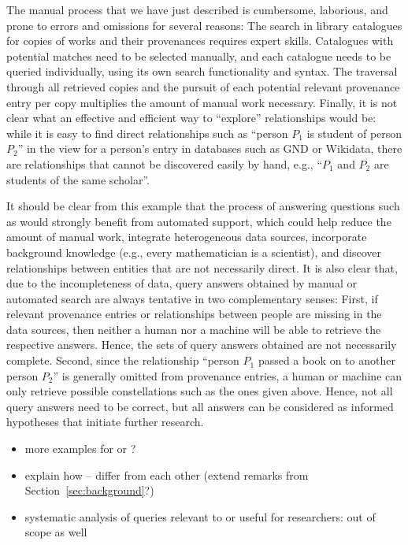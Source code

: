 The manual process that we have just described is cumbersome, laborious, and prone to errors and omissions for several reasons:
The search in library catalogues for copies of works and their provenances requires expert skills.
Catalogues with potential matches need to be selected manually,
and each catalogue needs to be queried individually, using its own search functionality and syntax. 
The traversal through all retrieved copies and the pursuit of each potential relevant provenance entry per copy 
multiplies the amount of manual work necessary.
Finally, it is not clear what an effective and efficient way to \enquote{explore} relationships would be:
while it is easy to find direct relationships such as \enquote{person $P_1$ is student of person $P_2$} in the view for a person's entry
in databases such as GND or Wikidata, there are relationships that cannot be discovered easily by hand,
e.g., \enquote{$P_1$ and $P_2$ are students of the same scholar}.

It should be clear from this example that the process of answering questions such as 
would strongly benefit from automated support, which could help reduce the amount of manual work, integrate heterogeneous data sources,
incorporate background knowledge (e.g., every mathematician is a scientist),
and discover relationships between entities that are not necessarily direct.
It is also clear that, due to the incompleteness of data, query answers obtained by manual or automated search
are always tentative in two complementary senses: First, if relevant provenance entries or relationships between people are missing
in the data sources, then neither a human nor a machine will be able to retrieve the respective answers. Hence, the sets of query answers obtained
are not necessarily complete.
Second, since the relationship \enquote{person $P_1$ passed a book on to another person $P_2$} is generally omitted from
provenance entries, a human or machine can only retrieve possible constellations such as the ones
given above. Hence, not all query answers need to be correct, but all answers can be considered
as informed hypotheses that initiate further research.


%
\begin{itemize}
  \item
    more examples for  or ?
  \item
    explain how -- differ from each other (extend remarks from Section~\ref{sec:background}?)
  \item
    systematic analysis of queries relevant to or useful for researchers: out of scope as well
\end{itemize}
